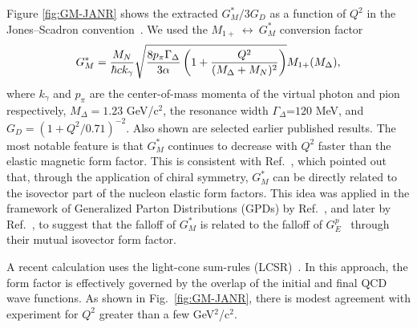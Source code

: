\documentclass[aps,prl,twocolumn,superscriptaddress]{revtex4}
\begin{document}
Figure \ref{fig:GM-JANR} shows the extracted $G_M^*/3G_D$ as a function 
of $Q^2$ in the Jones--Scadron convention~\cite{bib:Jones-Scadron}. We 
used the 
$M_{1+}~\leftrightarrow~G_M^*$ conversion factor 
$$
 G_M^*={{M_N}\over{ \hbar c k_\gamma}} \sqrt{{{8 p_{\pi}\Gamma_\Delta}
 \over{3\alpha}}\left({1+{{Q^2}\over{(M_\Delta+M_N)^2}}}\right)}
 M_{1+}(M_\Delta),
$$ 
where $k_\gamma$ and $p_{\pi}$ are the center-of-mass momenta of the virtual 
photon and pion respectively, $M_\Delta=1.23$ GeV/c$^2$, the resonance width 
$\Gamma_\Delta$=$120$ MeV, and $G_D=(1+Q^2/0.71)^{-2}$. Also shown are 
selected earlier published results. The most notable feature is that $G_M^*$ 
continues to decrease with $Q^2$ faster than the elastic magnetic form 
factor. This is consistent with Ref.~\cite{bib:goeke-gpd}, which pointed out 
that, through the application of chiral symmetry, $G_M^*$ can be directly 
related to the isovector part of the nucleon elastic form factors. This idea 
was applied in the framework of Generalized Parton Distributions (GPDs) by 
Ref.~\cite{bib:Stoler-Delta}, and later by Ref.~\cite{bib:Guidal-gpd}, to 
suggest that the falloff of $G_M^*$ is related to the falloff of 
$G_E^p$~\cite{bib:Gayou-gep} through their mutual isovector form factor. 

A recent calculation uses the light-cone sum-rules 
(LCSR)~\cite{bib:Braun-LC-soft}. In this approach, the form 
factor is effectively governed  by the overlap of the initial and final QCD 
wave functions. As shown in Fig.~\ref{fig:GM-JANR}, there is modest agreement 
with experiment for $Q^2 $ greater than a few GeV$^2$/c$^2$.
\end{document}
